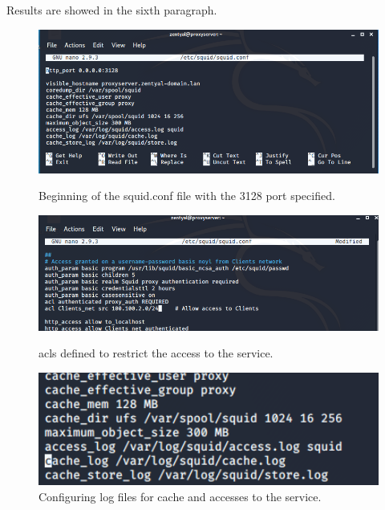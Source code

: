 Results are showed in the sixth paragraph.\\

\begin{figure}[!htb]
\centering
\begin{minipage}{.33\textwidth}
  \centering
  \includegraphics[width=1\textwidth]{squidConf1.png}
  \caption[a]{Beginning of the squid.conf file with the 3128 port specified.}\label{fig:4}
\end{minipage}%
\begin{minipage}{.33\textwidth}
  \centering
  \includegraphics[width=1\textwidth]{squidConf2.png}
  \caption[a]{acls defined to restrict the access to the service.}\label{fig:5}
\end{minipage}
\begin{minipage}{.33\textwidth}
  \centering
  \includegraphics[width=1\textwidth]{squidConf3.png}
  \caption[a]{Configuring log files for cache and accesses to the service.}\label{fig:6}
\end{minipage}
\end{figure}
